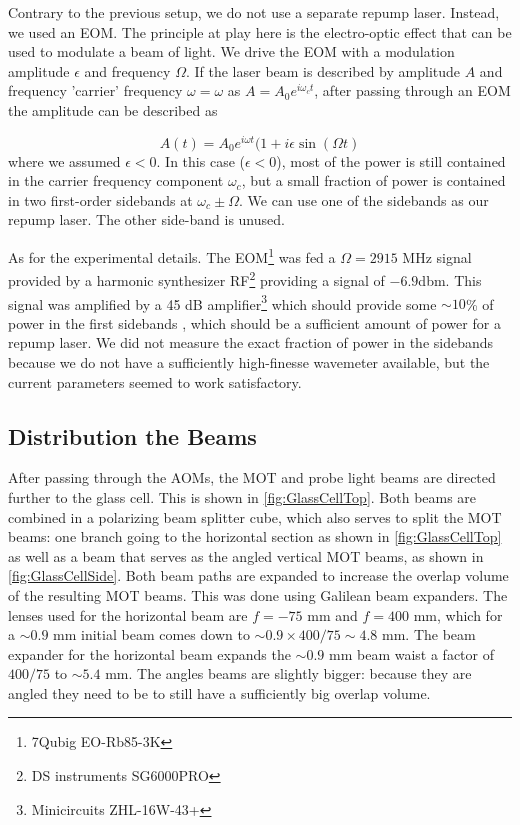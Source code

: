 Contrary to the previous setup, we do not use a separate repump laser. 
Instead, we used an \ac{EOM}.
The principle at play here is the electro-optic effect that can be used to modulate a beam of light. 
We drive the EOM with a modulation amplitude $\epsilon$ and frequency $\Omega$.
If the laser beam is described by amplitude $A$ and frequency 'carrier' frequency $\omega = \omega$ as $A = A_0 e^{i \omega_c t}$, after passing through an EOM the amplitude can be described as

\begin{equation}
    A(t) = A_0 e^{i \omega t}(1+i \epsilon \sin(\Omega t)
\end{equation}
where we assumed $\epsilon < 0$. In this case ($\epsilon <0$), most of the power is still contained in the carrier frequency component $\omega_c$, but a small fraction of power is contained in two first-order sidebands at $\omega_c \pm \Omega$.
We can use one of the sidebands as our repump laser. 
The other side-band is unused. 

As for the experimental details.
The EOM\footnote{7Qubig EO-Rb85-3K} was fed a $\Omega = 2915$ MHz signal provided by a harmonic synthesizer RF\footnote{DS instruments SG6000PRO} providing a signal of $-6.9$dbm.
This signal was amplified by a 45 dB amplifier\footnote{Minicircuits ZHL-16W-43+} which should provide some $\sim 10$\% of power in the first sidebands \cite{Rens2014}, which should be a sufficient amount of power for a repump laser. 
We did not measure the exact fraction of power in the sidebands because we do not have a sufficiently high-finesse wavemeter available, but the current parameters seemed to work satisfactory. 

\subsection{Distribution the Beams}

After passing through the AOMs, the MOT and probe light beams are directed further to the glass cell. 
This is shown in \cref{fig:GlassCellTop}.
Both beams are combined in a polarizing beam splitter cube, which also serves to split the MOT beams: one branch going to the horizontal section as shown in \cref{fig:GlassCellTop} as well as a beam that serves as the angled vertical MOT beams, as shown in \cref{fig:GlassCellSide}. 
Both beam paths are expanded to increase the overlap volume of the resulting MOT beams.
This was done using Galilean beam expanders. 
The lenses used for the horizontal beam are $f=-75$ mm and $f=400$ mm, which for a $\sim 0.9$ mm initial beam comes down to $\sim 0.9 \times 400/75 \sim 4.8$ mm.
The beam expander for the horizontal beam expands the $\sim0.9$ mm beam waist a factor of $400/75$ to $\sim5.4$ mm.
The angles beams are slightly bigger: because they are angled they need to be to still have a sufficiently big overlap volume. 


